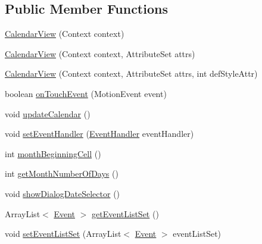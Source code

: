 \subsection*{Public Member Functions}
\begin{DoxyCompactItemize}
\item 
\hyperlink{classcom_1_1agenda_1_1ter_1_1smartgenda_1_1_calendar_view_ada673e7dbcaab8ff538367442caac953}{Calendar\-View} (Context context)
\item 
\hyperlink{classcom_1_1agenda_1_1ter_1_1smartgenda_1_1_calendar_view_a1d192128b714df968a3adcd606726f27}{Calendar\-View} (Context context, Attribute\-Set attrs)
\item 
\hyperlink{classcom_1_1agenda_1_1ter_1_1smartgenda_1_1_calendar_view_a2fc066352f65d76271f6cd4e1fa150bc}{Calendar\-View} (Context context, Attribute\-Set attrs, int def\-Style\-Attr)
\item 
boolean \hyperlink{classcom_1_1agenda_1_1ter_1_1smartgenda_1_1_calendar_view_aaa0f7ed690e2f7ad3cc03deaf8b24880}{on\-Touch\-Event} (Motion\-Event event)
\item 
void \hyperlink{classcom_1_1agenda_1_1ter_1_1smartgenda_1_1_calendar_view_a6dfef6c5724b215522f6e2b386088b49}{update\-Calendar} ()
\item 
void \hyperlink{classcom_1_1agenda_1_1ter_1_1smartgenda_1_1_calendar_view_ae496772fd31de2f17259429eff8c1d10}{set\-Event\-Handler} (\hyperlink{interfacecom_1_1agenda_1_1ter_1_1smartgenda_1_1_calendar_view_1_1_event_handler}{Event\-Handler} event\-Handler)
\item 
int \hyperlink{classcom_1_1agenda_1_1ter_1_1smartgenda_1_1_calendar_view_a9005785dec101af76b71fb0a1cfdbc09}{month\-Beginning\-Cell} ()
\item 
int \hyperlink{classcom_1_1agenda_1_1ter_1_1smartgenda_1_1_calendar_view_a81649cb5100921c6a471031be0024fc5}{get\-Month\-Number\-Of\-Days} ()
\item 
void \hyperlink{classcom_1_1agenda_1_1ter_1_1smartgenda_1_1_calendar_view_a4e3c6808a8b76fd437c09c08fb35f62e}{show\-Dialog\-Date\-Selector} ()
\item 
Array\-List$<$ \hyperlink{classcom_1_1agenda_1_1ter_1_1model_1_1_event}{Event} $>$ \hyperlink{classcom_1_1agenda_1_1ter_1_1smartgenda_1_1_calendar_view_a91a4c8fb2a420d5206b735efcf0e029e}{get\-Event\-List\-Set} ()
\item 
void \hyperlink{classcom_1_1agenda_1_1ter_1_1smartgenda_1_1_calendar_view_aa929b17b93451c4ceed219f51b9f07e3}{set\-Event\-List\-Set} (Array\-List$<$ \hyperlink{classcom_1_1agenda_1_1ter_1_1model_1_1_event}{Event} $>$ event\-List\-Set)
\end{DoxyCompactItemize}


